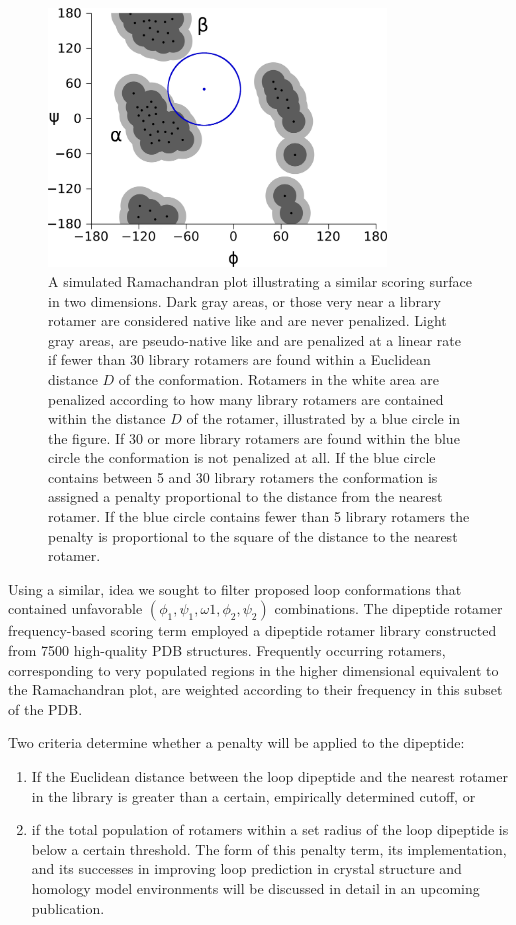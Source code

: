 \begin{figure}[h]
    \centering
    \includegraphics[width=0.8\textwidth,height=0.5\textheight,keepaspectratio]{figures/rfs_ex.png}
    \caption{A simulated Ramachandran plot illustrating a similar scoring surface in two dimensions.
Dark gray areas, or those very near a library rotamer are considered native like and are never penalized.
Light gray areas, are pseudo-native like and are penalized at a linear rate if fewer than 30 library rotamers are found within a Euclidean distance $D$ of the conformation.
Rotamers in the white area are penalized according to how many library rotamers are contained within the distance $D$ of the rotamer, illustrated by a blue circle in the figure.
If 30 or more library rotamers are found within the blue circle the conformation is not penalized at all.
If the blue circle contains between 5 and 30 library rotamers the conformation is assigned a penalty proportional to the distance from the nearest rotamer.
If the blue circle contains fewer than 5 library rotamers the penalty is proportional to the square of the distance to the nearest rotamer.}
    \label{figure:rfs_plot}
\end{figure}

Using a similar, idea we sought to filter proposed loop conformations that contained unfavorable $(\phi_{1}, \psi_{1}, \omega{1}, \phi_{2}, \psi_{2})$ combinations.
The dipeptide rotamer frequency-based scoring term employed a dipeptide rotamer library constructed from {\textapprox}7500 high-quality PDB structures.
Frequently occurring rotamers, corresponding to very populated regions in the higher dimensional equivalent to the Ramachandran plot, are weighted according to their frequency in this subset of the PDB.

Two criteria determine whether a penalty will be applied to the dipeptide: 
\begin{enumerate}
\item If the Euclidean distance between the loop dipeptide and the nearest rotamer in the library is greater than a certain, empirically determined cutoff, or
\item if the total population of rotamers within a set radius of the loop dipeptide is below a certain threshold.
The form of this penalty term, its implementation, and its successes in improving loop prediction in crystal structure and homology model environments will be discussed in detail in an upcoming publication.
\end{enumerate}

